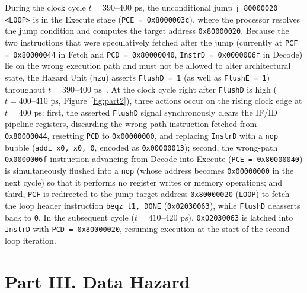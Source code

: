 \documentclass[11pt,a4paper]{article}
\begin{document}
During the clock cycle $t = 390\text{--}400\text{ ps}$, the unconditional jump \texttt{j 80000020 <LOOP>} is in the Execute stage (\texttt{PCE = 0x8000003c}), where the processor resolves the jump condition and computes the target address \texttt{0x80000020}. Because the two instructions that were speculatively fetched after the jump (currently at \texttt{PCF = 0x80000044} in Fetch and \texttt{PCD = 0x80000040}, \texttt{InstrD = 0x0000006f} in Decode) lie on the wrong execution path and must not be allowed to alter architectural state, the Hazard Unit (\texttt{hzu}) asserts \texttt{FlushD = 1} (as well as \texttt{FlushE = 1}) throughout $t = 390\text{--}400\text{ ps}$~\cite{harris2021}. At the clock cycle right after \texttt{FlushD} is high ($t = 400\text{--}410\text{ ps}$, Figure~\ref{fig:part2}), three actions occur on the rising clock edge at $t = 400\text{ ps}$: first, the asserted \texttt{FlushD} signal synchronously clears the IF/ID pipeline registers, discarding the wrong-path instruction fetched from \texttt{0x80000044}, resetting \texttt{PCD} to \texttt{0x00000000}, and replacing \texttt{InstrD} with a \texttt{nop} bubble (\texttt{addi x0, x0, 0}, encoded as \texttt{0x00000013}); second, the wrong-path \texttt{0x0000006f} instruction advancing from Decode into Execute (\texttt{PCE = 0x80000040}) is simultaneously flushed into a \texttt{nop} (whose address becomes \texttt{0x00000000} in the next cycle) so that it performs no register writes or memory operations; and third, \texttt{PCF} is redirected to the jump target address \texttt{0x80000020} (\texttt{LOOP}) to fetch the loop header instruction \texttt{beqz t1, DONE} (\texttt{0x02030063}), while \texttt{FlushD} deasserts back to \texttt{0}. In the subsequent cycle ($t = 410\text{--}420\text{ ps}$), \texttt{0x02030063} is latched into \texttt{InstrD} with \texttt{PCD = 0x80000020}, resuming execution at the start of the second loop iteration.


\section{Part III. Data Hazard}
\end{document}
